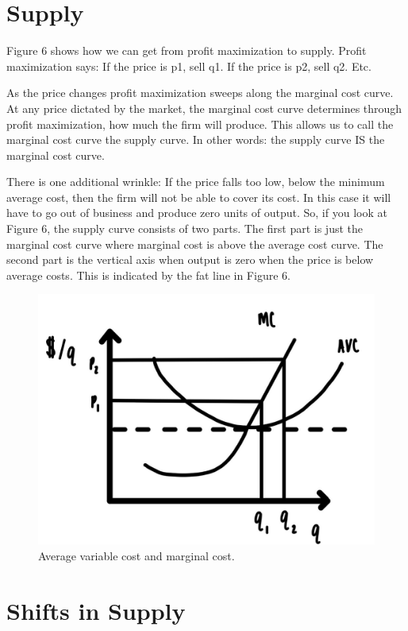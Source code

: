 \documentclass[
]{book}
\begin{document}
\hypertarget{supply-1}{%
\section{Supply}\label{supply-1}}

Figure 6 shows how we can get from profit maximization to supply. Profit maximization says:
If the price is p1, sell q1. If the price is p2, sell q2. Etc.

As the price changes profit maximization sweeps along the marginal cost curve. At any price dictated by the market, the marginal cost curve determines through profit maximization, how much the firm will produce. This allows us to call the marginal cost curve the supply curve. In other words: the supply curve IS the marginal cost curve.

There is one additional wrinkle: If the price falls too low, below the minimum average cost, then the firm will not be able to cover its cost. In this case it will have to go out of business and produce zero units of output. So, if you look at Figure 6, the supply curve consists of two parts. The first part is just the marginal cost curve where marginal cost is above the average cost curve. The second part is the vertical axis when output is zero when the price is below average costs. This is indicated by the fat line in Figure 6.

\begin{figure}

{\centering \includegraphics[width=0.75\linewidth]{img/supply/fig6} 

}

\caption{Average variable cost and marginal cost.}\label{fig:supply06}
\end{figure}

\hypertarget{shifts-in-supply}{%
\section{Shifts in Supply}\label{shifts-in-supply}}
\end{document}
